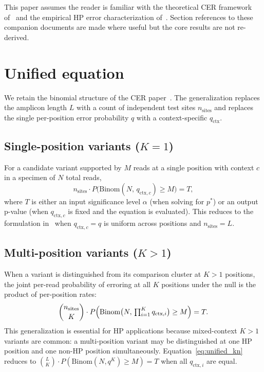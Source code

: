 \documentclass[11pt]{article}
\begin{document}
This paper assumes the reader is familiar with the theoretical CER framework
of~\cite{cer_paper} and the empirical HP error characterization
of~\cite{hp_paper}. Section references to these companion documents are made
where useful but the core results are not re-derived.

\section{Unified equation}
\label{sec:unified}

We retain the binomial structure of the CER paper~\cite{cer_paper}. The
generalization replaces the amplicon length $L$ with a count of independent test
sites $n_\text{sites}$ and replaces the single per-position error probability
$q$ with a context-specific $q_\text{ctx}$.

\subsection{Single-position variants ($K = 1$)}

For a candidate variant supported by $M$ reads at a single position with context
$c$ in a specimen of $N$ total reads,
\begin{equation}
\label{eq:unified_k1}
n_\text{sites} \cdot P\bigl(\mathrm{Binom}(N,\, q_{\text{ctx},c}) \geq M\bigr) = T,
\end{equation}
where $T$ is either an input significance level $\alpha$ (when solving for
$p^*$) or an output p-value (when $q_{\text{ctx},c}$ is fixed and the equation
is evaluated). This reduces to the formulation in~\cite{cer_paper} when
$q_{\text{ctx},c} = q$ is uniform across positions and
$n_\text{sites} = L$.

\subsection{Multi-position variants ($K > 1$)}

When a variant is distinguished from its comparison cluster at $K > 1$
positions, the joint per-read probability of erroring at all $K$ positions under
the null is the product of per-position rates:
\begin{equation}
\label{eq:unified_kn}
\binom{n_\text{sites}}{K} \cdot P\Bigl(\mathrm{Binom}\bigl(N,\, \textstyle\prod_{i=1}^{K} q_{\text{ctx},i}\bigr) \geq M\Bigr) = T.
\end{equation}
This generalization is essential for HP applications because mixed-context
$K > 1$ variants are common: a multi-position variant may be distinguished at
one HP position and one non-HP position simultaneously. Equation~\ref{eq:unified_kn}
reduces to $\binom{L}{K} \cdot P(\mathrm{Binom}(N, q^K) \geq M) = T$ when all
$q_{\text{ctx},i}$ are equal.
\end{document}
